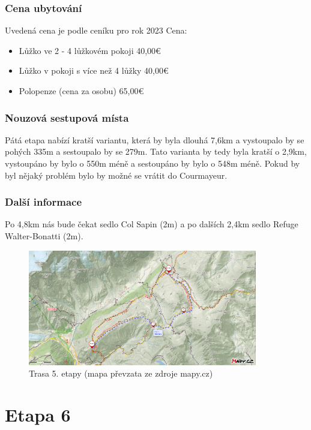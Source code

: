 \subsubsection*{Cena ubytování}
\noindent Uvedená cena je podle ceníku pro rok 2023
\noindent Cena:
\begin{itemize}
	\item Lůžko ve 2 - 4 lůžkovém pokoji 40,00\:€
	\item Lůžko v pokoji s více než 4 lůžky 40,00\:€
	\item Polopenze (cena za osobu) 65,00\:€
	
\end{itemize}
\subsubsection*{Nouzová sestupová místa}
Pátá etapa nabízí kratší variantu, která by byla dlouhá 7,6\:km a vystoupalo by se pohých 335\:m a sestoupalo by se 279\:m. Tato varianta by tedy byla kratší o 2,9\:km, vystoupáno by bylo o 550\:m méně a sestoupáno by bylo o 548\:m méně. Pokud by byl nějaký problém bylo by možné se vrátit do Courmayeur.
\subsubsection*{Další informace}
Po 4,8\:km nás bude čekat sedlo Col Sapin (2\:m) a po dalších 2,4\:km sedlo Refuge Walter-Bonatti (2\:m).
\begin{figure}[!hbt]
    \centering
    \includegraphics[width=10.0cm]{Figures/day_5.png}
    \caption[Trasa: den pátý]{Trasa 5. etapy (mapa převzata ze zdroje mapy.cz)}
    \label{Obr:day_5}
\end{figure} 
\section{Etapa 6}
